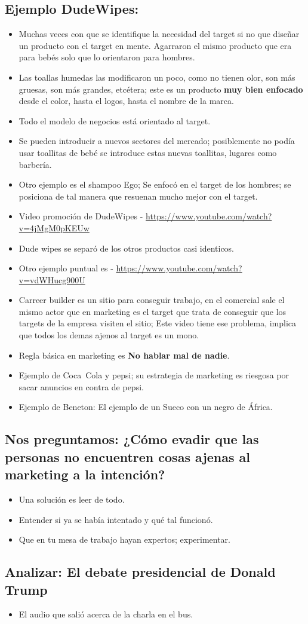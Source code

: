 \subsection{Ejemplo DudeWipes:}
\begin{itemize}
    \item Muchas veces con que se identifique la necesidad del target si no que diseñar un producto con el target en mente. Agarraron el mismo producto que era para bebés solo que lo orientaron para hombres.
    \item Las toallas humedas las modificaron un poco, como no tienen olor, son más gruesas, son más grandes, etcétera; este es un producto \textbf{muy bien enfocado} desde el color, hasta el logos, hasta el nombre de la marca.
    \item Todo el modelo de negocios está orientado al target.
    \item Se pueden introducir a nuevos sectores del mercado; posiblemente no podía usar toallitas de bebé se introduce estas nuevas toallitas, lugares como barbería.
    \item Otro ejemplo es el shampoo Ego; Se enfocó en el target de los hombres; se posiciona de tal manera que resuenan mucho mejor con el target.
    \item Video promoción de DudeWipes - \url{https://www.youtube.com/watch?v=4jMgM0pKEUw}
    \item Dude wipes se separó de los otros productos casi identicos.
    \item Otro ejemplo puntual es - \url{https://www.youtube.com/watch?v=vdWHucg900U}
    \item Carreer builder es un sitio para conseguir trabajo, en el comercial sale el mismo actor que en marketing es el target que trata de conseguir que los targets de la empresa visiten el sitio; Este video tiene ese problema, implica que todos los demas ajenos al target es un mono.
    \item Regla básica en marketing es \textbf{No hablar mal de nadie}.
    \item Ejemplo de Coca~Cola y pepsi; su estrategia de marketing es riesgosa por sacar anuncios en contra de pepsi.
    \item Ejemplo de Beneton: El ejemplo de un Sueco con un negro de África.
\end{itemize}

\subsection{\textbf{Nos preguntamos:} ¿Cómo evadir que las personas no encuentren cosas ajenas al marketing a la intención?}
\begin{itemize}
    \item Una solución es leer de todo. 
    \item Entender si ya se había intentado y qué tal funcionó.
    \item Que en tu mesa de trabajo hayan expertos; experimentar.
\end{itemize}

\subsection{Analizar: El debate presidencial de Donald Trump}
\begin{itemize}
    \item El audio que salió acerca de la charla en el bus.
\end{itemize}
